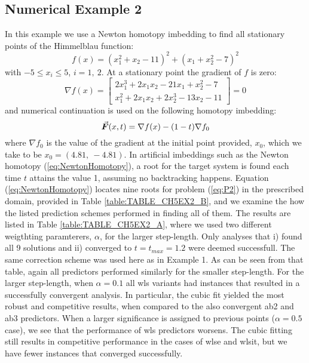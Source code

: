 \subsection{Numerical Example 2}
In this example we use a Newton homotopy imbedding to find all stationary points
of the Himmelblau function:
\begin{equation}
	f(x)=(x_1^2+x_2-11)^2+(x_1+x_2^2-7)^2
	\label{eq:HIMMEL}
\end{equation}
with $-5\leq x_i\leq 5$, $i=1,\ 2$. At a stationary point the gradient of $f$ is
zero:
\begin{equation}
	\nabla f(x) = \begin{bmatrix}
		2x_1^3+2x_1x_2-21x_1+x_2^2-7\\
		x_1^2+2x_1x_2+2x_2^3-13x_2-11
	\end{bmatrix}=0
	\label{eq:P2}
\end{equation}
and numerical continuation is used on the following homotopy imbedding:
\begin{equation}
	\vec{\bm{F}}(x,t) = \nabla f(x)-(1-t)\nabla f_0
	\label{eq:NewtonHomotopy}
\end{equation}
where $\nabla f_0$ is the value of the gradient at the initial point provided,
$x_0$, which we take to be $x_0=(4.81,\ -4.81)$. In artificial imbeddings such
as the Newton homotopy (\ref{eq:NewtonHomotopy}), a root for the target system 
is 
found each time
$t$ attains the value 1, assuming no backtracking happens. Equation 
(\ref{eq:NewtonHomotopy})
locates nine roots for problem (\ref{eq:P2}) in the
prescribed domain, provided in Table \ref{table:TABLE_CH5EX2_B}, and we examine 
the 
how the listed prediction schemes performed in finding all of them.  
The results are listed in Table \ref{table:TABLE_CH5EX2_A}, where we used
two different weigthting paramterers, $\alpha$, for the larger step-length. Only
analyses that i) found all 9 solutions and ii) converged to
$t=t_{max}=1.2$ were deemed successfull. 
The same correction scheme was used here as in Example 1. As can be seen from 
that table, again all predictors performed similarly for the smaller 
step-length. For the larger step-length, when $\alpha=0.1$ all \acrshort{wls} 
variants had instances that resulted in a successfully convergent analysis. In 
particular, the cubic fit yielded the most robust and competitive results, when 
compared to the also convergent \acrshort{ab2} and \acrshort{ab3} predictors. 
When a larger significance is assigned to previous points ($\alpha=0.5$ case), 
we see that the performance of \acrshort{wls} predictors worsens. The cubic 
fitting still results in competitive performance in the cases of 
\acrshort{wlse} and \acrshort{wlsit}, but we have fewer instances that 
converged successfully.


